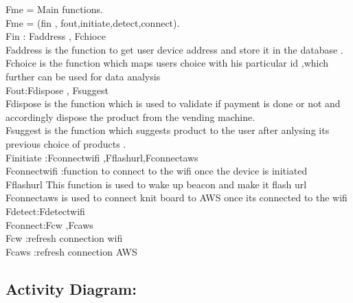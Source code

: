 \documentclass[oneside,a4paper,12pt]{report}
\begin{document}
Fme = Main functions.\\
Fme = (fin , fout,initiate,detect,connect).\\
Fin : {Faddress , Fchioce}\\
Faddress is the function to get user device address and store it in the database .
Fchoice is the function which maps users choice with his particular id ,which further can be used for data analysis \\
Fout:{Fdispose , Fsuggest}\\
Fdispose is the function which is used to validate if payment is done or not and accordingly dispose the product from the vending machine.\\
Fsuggest is the function which suggests product to the user after anlysing its previous choice of products .\\
Finitiate :{Fconnectwifi ,Fflashurl,Fconnectaws}\\
Fconnectwifi :function to connect to the wifi once the device is initiated\\
Fflashurl This function is used to wake up beacon and make it flash url\\
Fconnectaws is used to connect knit board to AWS once its connected to the wifi\\
Fdetect:{Fdetectwifi}\\
Fconnect:{Fcw ,Fcaws}\\
Fcw :refresh connection wifi\\
Fcaws :refresh connection AWS\\
\subsection{Activity Diagram:}
\end{document}
